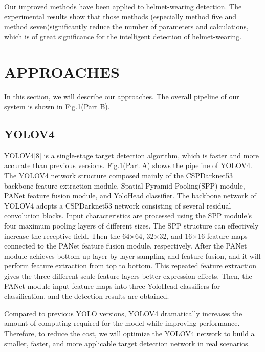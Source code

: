 \documentclass[journal]{IEEEtran}
\begin{document}
Our improved methods have been applied to helmet-wearing
detection. The experimental results show that those methods
(especially method five and method seven)significantly reduce
the number of parameters and calculations, which is of great
significance for the intelligent detection of helmet-wearing.

\section{APPROACHES}
In this section, we will describe our approaches. The overall pipeline of our system is shown in Fig.1(Part B).
\subsection{YOLOV4}
YOLOV4[8] is a single-stage target detection algorithm, which is faster and more accurate than previous versions. Fig.1(Part A) shows the pipeline of YOLOV4. The YOLOV4 network structure  composed mainly of the CSPDarknet53 backbone feature extraction module, Spatial Pyramid Pooling(SPP) module, PANet feature fusion module, and YoloHead classifier. The backbone network of YOLOV4 adopts a CSPDarknet53 network consisting of several residual convolution blocks. Input characteristics are processed using the SPP module's four maximum pooling layers of different sizes. The SPP structure can effectively increase the receptive field. Then the 64×64, 32×32, and 16×16 feature maps connected to the PANet feature fusion module, respectively. After the PANet module achieves bottom-up layer-by-layer sampling and feature fusion, and it will perform feature extraction from top to bottom.  
This repeated feature extraction gives the three different scale feature layers  better expression effects.
Then, the PANet module input feature maps into three YoloHead classifiers for classification, and the detection results are obtained.

 Compared to previous YOLO versions, YOLOV4 dramatically increases the amount of computing required for the model while improving performance. Therefore, to reduce the cost, we will optimize the YOLOV4 network to build a smaller, faster, and more applicable target detection network in real scenarios.
\end{document}
